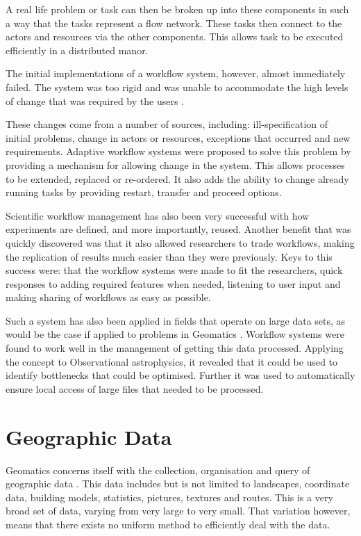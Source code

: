\documentclass[12pt,a4paper]{report}
\begin{document}
A real life problem or task can then be broken up into these components in
such a way that the tasks represent a flow network. These tasks then connect to
the actors and resources via the other
components\cite[p.~4]{Taylor:2006:WES:1196459}.  This allows task to be
executed efficiently in a distributed manor.

The initial implementations of a workflow system, however, almost
immediately failed. The system was too rigid and was unable to accommodate the
high levels of change that was required by the users
\cite{Suchman:1983:OPP:357442.357445}.

These changes come from a number of sources, including: ill-specification
of initial problems, change in actors or resources, exceptions that occurred
and new requirements.  Adaptive workflow systems were proposed to solve this
problem by providing a mechanism for allowing change in the
system\cite{vanderAalst2002125}. This allows processes to be extended, replaced
or re-ordered. It also adds the ability to change already running tasks by
providing restart, transfer and proceed options.

Scientific workflow management has also been very successful with how
experiments are defined, and more importantly, reused. Another benefit that was
quickly discovered was that it also allowed researchers to trade workflows,
making the replication of results much easier than they were
previously\cite{4721191}. Keys to this success were: that the workflow systems
were made to fit the researchers, quick responses to adding required features
when needed, listening to user input and making sharing of workflows as easy as
possible.

Such a system has also been applied in fields that operate on large data
sets, as would be the case if applied to problems in Geomatics
\cite{Aragon:2009:WMH:1529282.1529491}.  Workflow systems were found to
work well in the management of getting this data processed. Applying the
concept to Observational astrophysics, it revealed that it could be used to
identify bottlenecks that could be optimised.  Further it was used to
automatically ensure local access of large files that needed to be processed.


\section{Geographic Data}
Geomatics concerns itself with the collection, organisation and query of
geographic data \cite{DiMartino:2007:TAG:1341012.1341081}.  This data includes
but  is not limited to landscapes, coordinate data, building models,
statistics, pictures, textures and routes. This is a very broad set of data,
varying from very large to very small.  That variation however, means that
there exists no uniform method to efficiently deal with the data.
\end{document}
